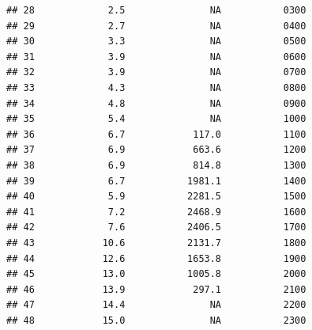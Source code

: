 \documentclass[
]{article}
\newenvironment{Shaded}{\begin{snugshade}}{\end{snugshade}}
\newcommand{\AttributeTok}[1]{\textcolor[rgb]{0.13,0.29,0.53}{#1}}
\newcommand{\CommentTok}[1]{\textcolor[rgb]{0.56,0.35,0.01}{\textit{#1}}}
\newcommand{\FunctionTok}[1]{\textcolor[rgb]{0.13,0.29,0.53}{\textbf{#1}}}
\newcommand{\NormalTok}[1]{#1}
\newcommand{\OtherTok}[1]{\textcolor[rgb]{0.56,0.35,0.01}{#1}}
\newcommand{\SpecialCharTok}[1]{\textcolor[rgb]{0.81,0.36,0.00}{\textbf{#1}}}
\newcommand{\StringTok}[1]{\textcolor[rgb]{0.31,0.60,0.02}{#1}}
\begin{document}
\begin{verbatim}
## 28             2.5               NA           0300
## 29             2.7               NA           0400
## 30             3.3               NA           0500
## 31             3.9               NA           0600
## 32             3.9               NA           0700
## 33             4.3               NA           0800
## 34             4.8               NA           0900
## 35             5.4               NA           1000
## 36             6.7            117.0           1100
## 37             6.9            663.6           1200
## 38             6.9            814.8           1300
## 39             6.7           1981.1           1400
## 40             5.9           2281.5           1500
## 41             7.2           2468.9           1600
## 42             7.6           2406.5           1700
## 43            10.6           2131.7           1800
## 44            12.6           1653.8           1900
## 45            13.0           1005.8           2000
## 46            13.9            297.1           2100
## 47            14.4               NA           2200
## 48            15.0               NA           2300
\end{verbatim}

\begin{Shaded}
\end{Shaded}
\end{document}
